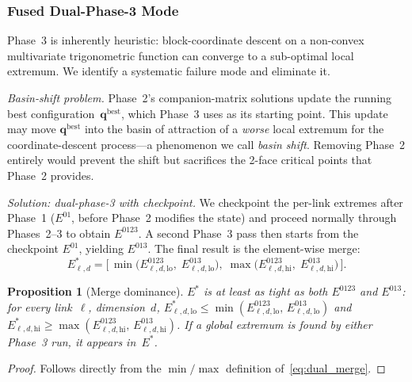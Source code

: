 \documentclass[journal]{IEEEtran}
\newtheorem{proposition}{Proposition}
\begin{document}

\subsubsection{Fused Dual-Phase-3 Mode}\label{sec:dual_phase3}

Phase~3 is inherently heuristic: block-coordinate descent on a
non-convex multivariate trigonometric function can converge to a
sub-optimal local extremum.
We identify a systematic failure mode and eliminate it.

\emph{Basin-shift problem.}
Phase~2's companion-matrix solutions update the running best
configuration~$\bm{q}^\text{best}$, which Phase~3 uses as its
starting point.
This update may move $\bm{q}^\text{best}$ into the basin of
attraction of a \emph{worse} local extremum for the coordinate-descent
process---a phenomenon we call \emph{basin shift}.
Removing Phase~2 entirely would prevent the shift but sacrifices the
2-face critical points that Phase~2 provides.

\emph{Solution: dual-phase-3 with checkpoint.}
We checkpoint the per-link extremes after Phase~1
($E^{01}$, before Phase~2 modifies the state) and proceed normally
through Phases~2--3 to obtain $E^{0123}$.
A second Phase~3 pass then starts from the checkpoint $E^{01}$,
yielding $E^{013}$.
The final result is the element-wise merge:
\begin{equation}\label{eq:dual_merge}
  E^*_{\ell,d} = \bigl[\,
    \min\!\bigl(E^{0123}_{\ell,d,\mathrm{lo}},\;
                E^{013}_{\ell,d,\mathrm{lo}}\bigr),\;
    \max\!\bigl(E^{0123}_{\ell,d,\mathrm{hi}},\;
                E^{013}_{\ell,d,\mathrm{hi}}\bigr)
  \,\bigr].
\end{equation}

\begin{proposition}[Merge dominance]\label{prop:merge}
$E^*$ is at least as tight as both $E^{0123}$ and $E^{013}$:
for every link~$\ell$, dimension~$d$,
$E^*_{\ell,d,\mathrm{lo}} \leq \min(E^{0123}_{\ell,d,\mathrm{lo}},\,
E^{013}_{\ell,d,\mathrm{lo}})$
and
$E^*_{\ell,d,\mathrm{hi}} \geq \max(E^{0123}_{\ell,d,\mathrm{hi}},\,
E^{013}_{\ell,d,\mathrm{hi}})$.
If a global extremum is found by \emph{either} Phase~3 run,
it appears in~$E^*$.
\end{proposition}
\begin{proof}
Follows directly from the $\min/\max$ definition of~\eqref{eq:dual_merge}.
\end{proof}
\end{document}
